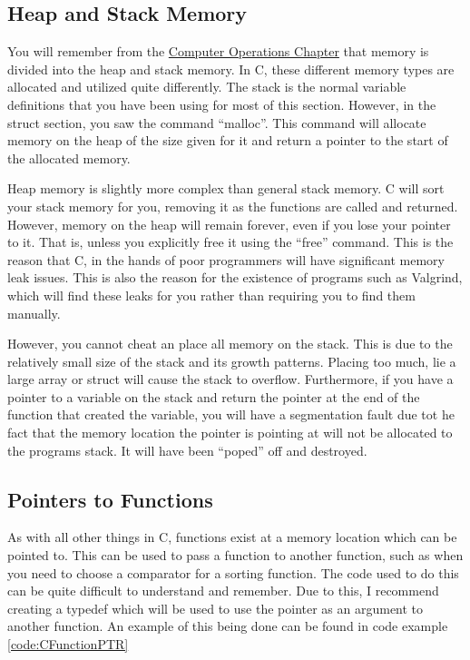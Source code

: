 \documentclass[a4paper,11pt]{report}
\begin{document}
		\subsection{Heap and Stack Memory}
			You will remember from the \hyperref[ch:ComputerOperations]{Computer Operations Chapter} that memory is divided into the heap and stack memory. 
			In C, these different memory types are allocated and utilized quite differently. 
			The stack is the normal variable definitions that you have been using for most of this section. 
			However, in the struct section, you saw the command ``malloc''. 
			This command will allocate memory on the heap of the size given for it and return a pointer to the start of the allocated memory. 
			
			Heap memory is slightly more complex than general stack memory. 
			C will sort your stack memory for you, removing it as the functions are called and returned. 
			However, memory on the heap will remain forever, even if you lose your pointer to it. 
			That is, unless you explicitly free it using the ``free'' command. 
			This is the reason that C, in the hands of poor programmers will have significant memory leak issues. 
			This is also the reason for the existence of programs such as Valgrind, which will find these leaks for you rather than requiring you to find them manually. 
			
			However, you cannot cheat an place all memory on the stack. 
			This is due to the relatively small size of the stack and its growth patterns. 
			Placing too much, lie a large array or struct will cause the stack to overflow. 
			Furthermore, if you have a pointer to a variable on the stack and return the pointer at the end of the function that created the variable, 
			you will have a segmentation fault due tot he fact that the memory location the pointer is pointing at will not be allocated to the programs stack. 
			It will have been ``poped'' off and destroyed. 

		\subsection{Pointers to Functions}
			As with all other things in C, functions exist at a memory location which can be pointed to. 
			This can be used to pass a function to another function, such as when you need to choose a comparator for a sorting function. 
			The code used to do this can be quite difficult to understand and remember. 
			Due to this, I recommend creating a typedef which will be used to use the pointer as an argument to another function. 
			An example of this being done can be found in code example \ref{code:CFunctionPTR}	
			\begin{code}
				C}]{./CFunctionPTR.c}
				\caption{Example of a C Function Pointers}
				\label{code:CFunctionPTR}
			\end{code}
\end{document}
